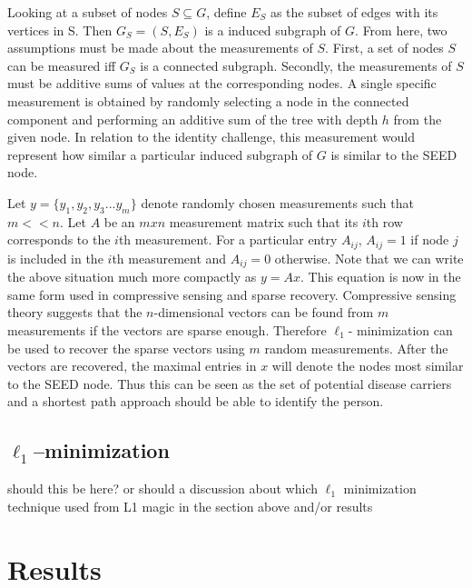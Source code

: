 \documentclass{article} %
\begin{document}
Looking at a subset of nodes  $S \subseteq G$, define $E_S$ as the subset of edges with its vertices in S. Then $G_S = (S,E_S)$ is a induced subgraph of $G$. From here, two assumptions must be made about the measurements of $S$. First, a set of nodes $S$ can be measured iff $G_S$ is a connected subgraph. Secondly, the measurements of $S$ must be additive sums of values at the corresponding nodes. A single specific measurement is obtained by randomly selecting a node in the connected component and performing an additive sum of the tree with depth $h$ from the given node. In relation to the identity challenge, this measurement would represent how similar a particular induced subgraph of $G$ is similar to the SEED node.

Let $y = \{ y_1, y_2, y_3 ... y_m \}$ denote randomly chosen measurements such that $m << n$.  Let $A$ be an $m x n$ measurement matrix such that its $i$th row corresponds to the $i$th measurement.  For a particular entry $A_{ij}$, $A_{ij} = 1$ if  node $j$ is included in the $i$th measurement and $A_{ij} = 0$ otherwise.
Note that we can write the above situation much more compactly as $y = Ax$. This equation is now in the same form used in compressive sensing and sparse recovery.  Compressive sensing theory suggests that the $n$-dimensional vectors can be found from $m$ measurements if the vectors are sparse enough. Therefore $\ell_1$- minimization can be used to recover the sparse vectors using $m$ random measurements.  After the vectors are recovered, the maximal entries in $x$  will denote the nodes most similar to the SEED node. Thus this can be seen as the set of potential disease carriers and a shortest path approach should be able to identify the person.
\subsection{$\ell_1$--minimization}
should this be here? or should a discussion about which $\ell_1$ minimization technique used from L1 magic in the section above and/or results



\section{Results}
\end{document}
